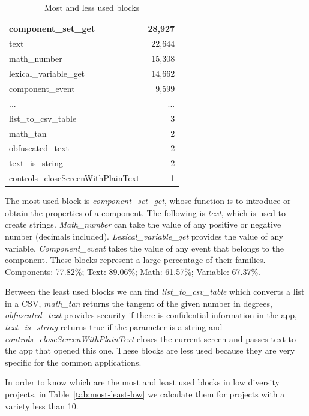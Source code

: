 \documentclass[a4paper]{article}
\begin{document}
\begin{table}
\begin{center}
\caption{Most and less used blocks}
\bigskip
\label{tab:most-least}
\begin{tabular}{|l|r|}
\hline
component\_set\_get & 28,927\\ \hline
text & 22,644\\ \hline
math\_number & 15,308\\ \hline
lexical\_variable\_get & 14,662\\ \hline
component\_event & 9,599\\ \hline
... & ... \\ \hline
list\_to\_csv\_table & 3\\ \hline
math\_tan & 2\\ \hline
obfuscated\_text & 2\\ \hline
text\_is\_string & 2\\ \hline
controls\_closeScreenWithPlainText & 1\\ \hline
\end{tabular}
\end{center}
\end{table}

The most used block is \emph{component\_set\_get}, whose function is to introduce or obtain the properties of a component. The following is \emph{text}, which is used to create strings. \emph{Math\_number} can take the value of any positive or negative number (decimals included). \emph{Lexical\_variable\_get} provides the value of any variable. \emph{Component\_event} takes the value of any event that belongs to the component.
These blocks represent a large percentage of their families. Components: 77.82\%; Text: 89.06\%; Math: 61.57\%; Variable: 67.37\%.

Between the least used blocks we can find \emph{list\_to\_csv\_table} which converts a list in a CSV, \emph{math\_tan} returns the tangent of the given number in degrees, \emph{obfuscated\_text} provides security if there is confidential information in the app, \emph{text\_is\_string} returns true if the parameter is a string and \emph{controls\_closeScreenWithPlainText} closes the current screen and passes text to the app that opened this one. These blocks are less used because they are very specific for the common applications.

In order to know which are the most and least used blocks in low diversity projects, in Table~\ref{tab:most-least-low} we calculate them for projects with a variety less than 10.
\end{document}
